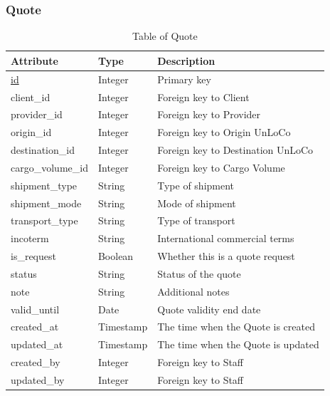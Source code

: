 \subsubsection{Quote}
\begin{table}[H]
    \centering
    \begin{tabular}{|p{3cm}|p{2cm}|p{\dimexpr\textwidth-6.8cm}|} %
        \hline
        \rowcolor[HTML]{C0C0C0} 
        \textbf{Attribute} & \textbf{Type} & \textbf{Description} \\ \hline
        \underline{id} & Integer & Primary key \\ \hline
        client\_id & Integer & Foreign key to Client \\ \hline
        provider\_id & Integer & Foreign key to Provider \\ \hline
        origin\_id & Integer & Foreign key to Origin UnLoCo \\ \hline
        destination\_id & Integer & Foreign key to Destination UnLoCo \\ \hline
        cargo\_volume\_id & Integer & Foreign key to Cargo Volume \\ \hline
        shipment\_type & String & Type of shipment \\ \hline
        shipment\_mode & String & Mode of shipment \\ \hline
        transport\_type & String & Type of transport \\ \hline
        incoterm & String & International commercial terms \\ \hline
        is\_request & Boolean & Whether this is a quote request \\ \hline
        status & String & Status of the quote \\ \hline
        note & String & Additional notes \\ \hline
        valid\_until & Date & Quote validity end date \\ \hline
        created\_at & Timestamp & The time when the Quote is created \\ \hline
        updated\_at & Timestamp & The time when the Quote is updated \\ \hline
        created\_by & Integer & Foreign key to Staff \\ \hline
        updated\_by & Integer & Foreign key to Staff \\ \hline
    \end{tabular}
    \caption{Table of Quote}
    \label{tab:quote-table}
\end{table}

